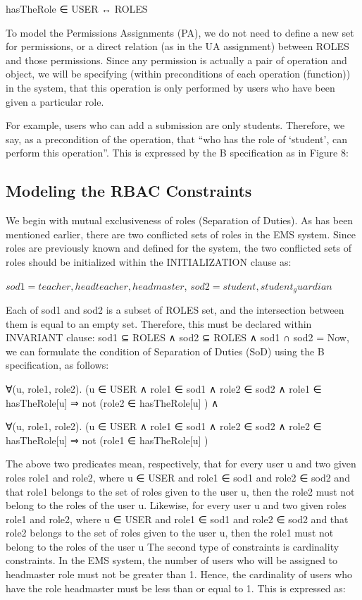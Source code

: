 hasTheRole ∈ USER ↔ ROLES

To model the Permissions Assignments (PA), we do not need to define a new set for permissions, or a direct relation (as in the UA assignment) between ROLES and those permissions.  Since any permission is actually a pair of operation and object, we will be specifying (within preconditions of each operation (function)) in the system, that this operation is only performed by users who have been given a particular role.

For example, users who can add a submission are only students.  Therefore, we say, as a precondition of the operation, that “who has the role of ‘student’, can perform this operation”.  This is expressed by the B specification as in Figure 8:


\subsection{Modeling the RBAC Constraints}

     We begin with mutual exclusiveness of roles  (Separation of Duties).  As has been mentioned earlier, there are two conflicted sets of roles in the EMS system.  Since roles are previously known and defined for the system, the two conflicted sets of roles should be initialized within the INITIALIZATION clause as:

$sod1 = {teacher, headteacher, headmaster}$,
$sod2 = {student, student_guardian}$

     Each of sod1 and sod2 is a subset of ROLES set, and the intersection between them is equal to an empty set.  Therefore, this must be declared within INVARIANT clause:
sod1 ⊆ ROLES  ∧
sod2 ⊆ ROLES  ∧
sod1 ∩ sod2 = { }
     Now, we can formulate the condition of Separation of Duties (SoD) using the B specification, as follows:

∀(u, role1, role2). (u ∈ USER  ∧  role1 ∈ sod1  ∧  role2 ∈ sod2  ∧  
        role1  ∈   hasTheRole[{u}]         ⇒  not (role2 ∈ hasTheRole[{u}] )  ∧

  ∀(u, role1, role2). (u ∈ USER  ∧  role1 ∈ sod1  ∧  role2 ∈ sod2  ∧  
        role2 ∈   hasTheRole[{u}]       ⇒  not (role1 ∈ hasTheRole[{u}] )  

     The above two predicates mean, respectively, that for every user u and two given roles role1 and role2, where u ∈ USER and role1 ∈ sod1 and role2 ∈ sod2 and that role1 belongs to the set of roles given to the user u, then the role2 must not belong to the roles of the user u.  Likewise, for every user u and two given roles role1 and role2, where u ∈ USER and role1 ∈ sod1 and role2 ∈ sod2 and that role2  belongs to the set of roles given to the user u, then the role1 must not belong to the roles of the user u
     The second type of constraints is cardinality constraints.  In the EMS system, the number of users who will be assigned to headmaster role must not be greater than 1.  Hence, the cardinality of users who have the role headmaster must be less than or equal to 1.  This is expressed as: 

